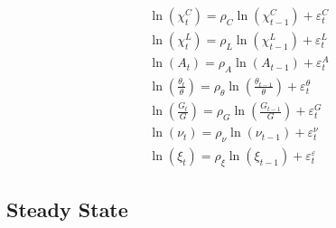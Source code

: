 \documentclass[12pt]{article}
\begin{document}
\begin{align*}
& \ln \left(\chi_{t}^{C}\right)=\rho_{C} \ln \left(\chi_{t-1}^{C}\right)+\varepsilon_{t}^{C} \\
& \ln \left(\chi_{t}^{L}\right)=\rho_{L} \ln \left(\chi_{t-1}^{L}\right)+\varepsilon_{t}^{L} \\
& \ln \left(A_{t}\right)=\rho_{A} \ln \left(A_{t-1}\right)+\varepsilon_{t}^{A} \\
& \ln \left(\frac{\theta_{t}}{\theta}\right)=\rho_{\theta} \ln \left(\frac{\theta_{t-1}}{\theta}\right)+\varepsilon_{t}^{\theta} \\
& \ln \left(\frac{G_{t}}{G}\right)=\rho_{G} \ln \left(\frac{G_{t-1}}{G}\right)+\varepsilon_{t}^{G} \\
& \ln \left(\nu_{t}\right)=\rho_{\nu} \ln \left(\nu_{t-1}\right)+\varepsilon_{t}^{\nu} \\
& \ln \left(\xi_{t}\right)=\rho_{\xi} \ln \left(\xi_{t-1}\right)+\varepsilon_{t}^{\varepsilon}
\end{align*}
\endgroup



\subsection{Steady State}
\end{document}
